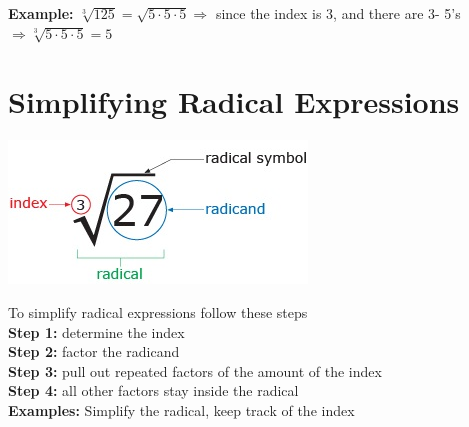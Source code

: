 \documentclass[12pt]{article}
\begin{document}
\textbf{Example:} $\sqrt[3]{125}=\sqrt{5\cdot5\cdot 5} \Longrightarrow$ since the index is 3, and there are 3- 5's $\Longrightarrow \sqrt[3]{5\cdot5\cdot5}=5$\\

\pagebreak

\section*{Simplifying Radical Expressions}

\begin{center}
\includegraphics[scale=.7]{radical.jpg}\\
\end{center}

To simplify radical expressions follow these steps\\

\textbf{Step 1:} determine the index\\

\textbf{Step 2:} factor the radicand\\

\textbf{Step 3:} pull out repeated factors of the amount of the index\\

\textbf{Step 4:} all other factors stay inside the radical\\

\textbf{Examples:} Simplify the radical, keep track of the index\\
\end{document}
